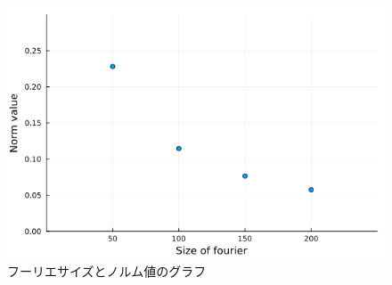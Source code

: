 \begin{figure}[htbp]
  \centering
  \includegraphics[scale=0.5]{img/scatter.png}
  \caption{フーリエサイズとノルム値のグラフ}
  \label{fig:norm-gra}
\end{figure}
